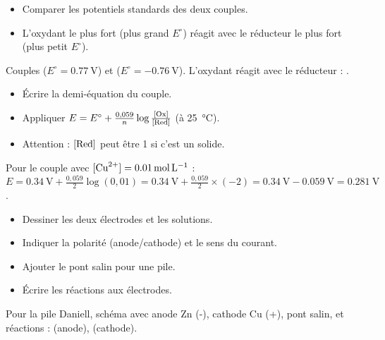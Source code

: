 \begin{itemize}
    \item Comparer les potentiels standards des deux couples.
    \item L'oxydant le plus fort (plus grand $E^\circ$) réagit avec le réducteur le plus fort (plus petit $E^\circ$).
\end{itemize}
\begin{exemple}
Couples  ($E^\circ = \SI{0.77}{\volt}$) et  ($E^\circ = \SI{-0.76}{\volt}$). L'oxydant  réagit avec le réducteur  : .
\end{exemple}

\begin{itemize}
    \item Écrire la demi-équation du couple.
    \item Appliquer $E = E^\circ + \frac{0,059}{n} \log \frac{[\mathrm{Ox}]}{[\mathrm{Red}]}$ (à \SI{25}{\celsius}).
    \item Attention : $[\mathrm{Red}]$ peut être 1 si c'est un solide.
\end{itemize}
\begin{exemple}
Pour le couple  avec $[\ce{Cu^2+}] = \SI{0.01}{\mol\per\litre}$ : $E = \SI{0.34}{\volt} + \frac{0,059}{2} \log(0,01) = \SI{0.34}{\volt} + \frac{0,059}{2} \times (-2) = \SI{0.34}{\volt} - \SI{0.059}{\volt} = \SI{0.281}{\volt}$.
\end{exemple}

\begin{itemize}
    \item Dessiner les deux électrodes et les solutions.
    \item Indiquer la polarité (anode/cathode) et le sens du courant.
    \item Ajouter le pont salin pour une pile.
    \item Écrire les réactions aux électrodes.
\end{itemize}
\begin{exemple}
Pour la pile Daniell, schéma avec anode Zn (-), cathode Cu (+), pont salin, et réactions :  (anode),  (cathode).
\end{exemple}

